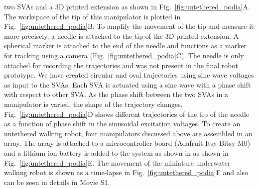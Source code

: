 two SVAs and a 3D printed extension as shown in Fig.~\ref{fig:untethered_podia}A. The workspace of the tip of this manipulator is plotted in Fig.~\ref{fig:untethered_podia}B. To amplify the movement of the tip and measure it more precisely, a needle is attached to the tip of the 3D printed extension. A spherical marker is attached to the end of the needle and functions as a marker for tracking using a camera (Fig.~\ref{fig:untethered_podia}C). The needle is only attached for recording the trajectories and was not present in the final robot prototype. We have created circular and oval trajectories using sine wave voltages as input to the SVAs. Each SVA is actuated using a sine wave with a phase shift with respect to other SVA. As the phase shift between the two SVAs in a manipulator is varied, the shape of the trajectory changes. Fig.~\ref{fig:untethered_podia}D shows different trajectories of the tip of the needle as a function of phase shift in the sinusoidal excitation voltages. To create an untethered walking robot, four manipulators discussed above are assembled in an array. The array is attached to a microcontroller board (Adafruit Itsy Bitsy M0) and a lithium ion battery is added to the system as shown in as shown in Fig.~\ref{fig:untethered_podia}E. The movement of the miniature underwater walking robot is shown as a time-lapse in Fig.~\ref{fig:untethered_podia}F and also can be seen in details in Movie S1.
